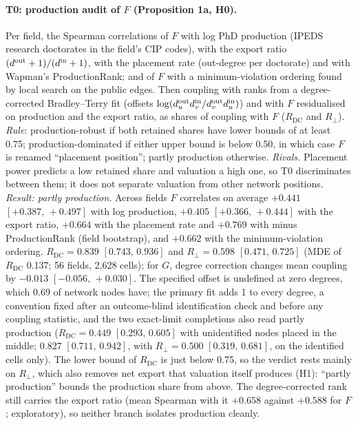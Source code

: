 \documentclass[11pt]{article}
\newcommand{\ci}[2]{$[#1,\allowbreak\,#2]$}
\begin{document}
\paragraph{T0: production audit of $F$ (Proposition 1a, H0).} Per field, the Spearman correlations of $F$ with
log PhD production (IPEDS research doctorates in the field's CIP codes), with the export ratio
$(d^{\rm out}+1)/(d^{\rm in}+1)$, with the placement rate (out-degree per doctorate) and with Wapman's
ProductionRank; and of $F$ with a minimum-violation ordering found by local search on the public edges. Then
coupling with ranks from a degree-corrected Bradley--Terry fit (offsets $\log(d^{\rm out}_ud^{\rm in}_v/
d^{\rm out}_vd^{\rm in}_u)$) and with $F$ residualised on production and the export ratio, as shares of coupling
with $F$ ($R_{\mathrm{DC}}$ and $R_\perp$). \emph{Rule}: production-robust if both retained shares have lower
bounds of at least 0.75; production-dominated if either upper bound is below 0.50, in which case $F$ is renamed
``placement position''; partly production otherwise. \emph{Rivals.} Placement power predicts a low retained share
and valuation a high one, so T0 discriminates between them; it does not separate valuation from other network
positions. \emph{Result: partly production.} Across fields $F$ correlates on average $+0.441$
\ci{+0.387}{+0.497} with log production, $+0.405$ \ci{+0.366}{+0.444} with the export ratio, $+0.664$ with the
placement rate and $+0.769$ with minus ProductionRank (field bootstrap), and $+0.662$ with the minimum-violation
ordering. $R_{\mathrm{DC}}=0.839$ \ci{0.743}{0.936} and $R_\perp=0.598$ \ci{0.471}{0.725} (MDE of $R_{\mathrm{DC}}$
0.137; 56 fields, 2,628 cells); for $G$, degree correction changes mean coupling by $-0.013$ \ci{-0.056}{+0.030}. The
specified offset is undefined at zero degrees, which 0.69 of network nodes have; the primary fit adds 1 to every
degree, a convention fixed after an outcome-blind identification check and before any coupling statistic, and the
two exact-limit completions also read partly production ($R_{\mathrm{DC}}=0.449$ \ci{0.293}{0.605} with
unidentified nodes placed in the middle; $0.827$ \ci{0.711}{0.942}, with $R_\perp=0.500$ \ci{0.319}{0.681}, on the
identified cells only). The lower bound of $R_{\mathrm{DC}}$ is just below 0.75, so the verdict rests mainly on
$R_\perp$, which also removes net export that valuation itself produces (H1): ``partly production'' bounds the
production share from above. The degree-corrected rank still carries the export ratio (mean Spearman with it
$+0.658$ against $+0.588$ for $F$; exploratory), so neither branch isolates production cleanly.
\end{document}
